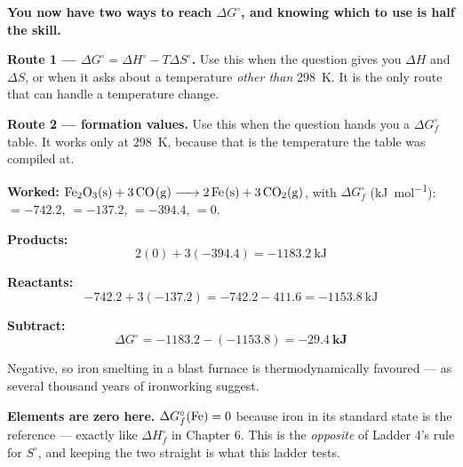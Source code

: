 \documentclass{apchem-worksheet}
\begin{document}
\begin{workedexample}
\textbf{You now have two ways to reach $\Delta G^{\circ}$, and knowing
which to use is half the skill.}

\textbf{Route 1 --- $\Delta G^{\circ} = \Delta H^{\circ} -
T\Delta S^{\circ}$.} Use this when the question gives you $\Delta H$
and $\Delta S$, or when it asks about a temperature \emph{other than}
\SI{298}{\kelvin}. It is the only route that can handle a temperature
change.

\textbf{Route 2 --- formation values.} Use this when the question hands
you a $\Delta G_{f}^{\circ}$ table. It works only at
\SI{298}{\kelvin}, because that is the temperature the table was
compiled at.

\textbf{Worked: $\ce{Fe2O3(s) + 3CO(g) -> 2Fe(s) + 3CO2(g)}$}, with
$\Delta G_{f}^{\circ}$ (\si{\kilo\joule\per\mole}):
 $= -742.2$,  $= -137.2$,  $= -394.4$,
 $= 0$.

\textbf{Products:}
\[ 2(0) + 3(-394.4) = \SI{-1183.2}{\kilo\joule} \]

\textbf{Reactants:}
\[ -742.2 + 3(-137.2) = -742.2 - 411.6 = \SI{-1153.8}{\kilo\joule} \]

\textbf{Subtract:}
\[ \Delta G^{\circ} = -1183.2 - (-1153.8)
   = \mathbf{\SI{-29.4}{\kilo\joule}} \]

Negative, so iron smelting in a blast furnace is thermodynamically
favoured --- as several thousand years of ironworking suggest.

\textbf{Elements are zero here.} $\Delta G_{f}^{\circ}(\ce{Fe}) = 0$
because iron in its standard state is the reference --- exactly like
$\Delta H_{f}^{\circ}$ in Chapter 6. This is the \emph{opposite} of
Ladder 4's rule for $S^{\circ}$, and keeping the two straight is what
this ladder tests.
\end{workedexample}
\end{document}
